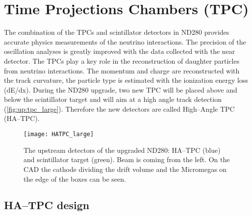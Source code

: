 \documentclass[../main.tex]{subfiles}
\begin{document}
\renewcommand{\labelitemi}{\ding{226}}
\renewcommand{\labelitemii}{\ding{227}}

\chapter{Time Projections Chambers (TPC)}
\label{ch:up:tpc}
The combination of the TPCs and scintillator detectors in ND280 provides accurate physics measurements of the neutrino interactions. The precision of the oscillation analyses is greatly improved with the data collected with the near detector. The TPCs play a key role in the reconstruction of daughter particles from neutrino interactions. The momentum and charge are reconstructed with the track curvature, the particle type is estimated with the ionization energy loss (dE/dx). During the ND280 upgrade, two new TPC will be placed above and below the scintillator target and will aim at a high angle track detection (\autoref{fig:up:tpc_large}). Therefore the new detectors are called High--Angle TPC (HA--TPC).

\begin{figure}[!ht]
  \centering
  \texttt{[image: HATPC\_large]}
  \caption{The upstream detectors of the upgraded ND280: HA--TPC (blue) and scintillator target (green). Beam is coming from the left. On the CAD the cathode dividing the drift volume and the Micromegas on the edge of the boxes can be seen.}
  \label{fig:up:tpc_large}
\end{figure}

\section{HA--TPC design}
\end{document}
